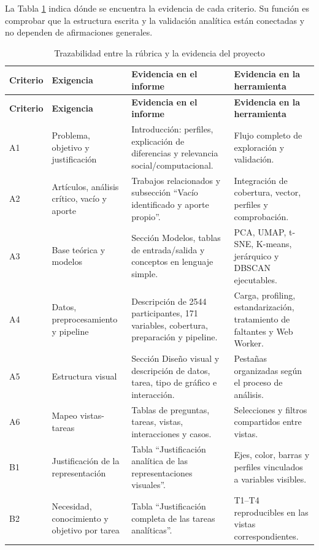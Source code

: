 \documentclass[12pt,a4paper]{article}
\begin{document}
La Tabla \ref{tab:rubrica} indica d\'onde se encuentra la evidencia de cada criterio. Su funci\'on es comprobar que la estructura escrita y la validaci\'on anal\'itica est\'an conectadas y no dependen de afirmaciones generales.

\begin{longtable}{p{1.05cm} p{3.3cm} p{5.1cm} p{4.3cm}}
\caption{Trazabilidad entre la r\'ubrica y la evidencia del proyecto}\label{tab:rubrica}\\
\toprule
\textbf{Criterio} & \textbf{Exigencia} & \textbf{Evidencia en el informe} & \textbf{Evidencia en la herramienta} \\
\midrule
\endfirsthead
\toprule
\textbf{Criterio} & \textbf{Exigencia} & \textbf{Evidencia en el informe} & \textbf{Evidencia en la herramienta} \\
\midrule
\endhead
A1 & Problema, objetivo y justificaci\'on & Introducci\'on: perfiles, explicaci\'on de diferencias y relevancia social/computacional. & Flujo completo de exploraci\'on y validaci\'on. \\
A2 & Art\'iculos, an\'alisis cr\'itico, vac\'io y aporte & Trabajos relacionados y subsecci\'on ``Vac\'io identificado y aporte propio''. & Integraci\'on de cobertura, vector, perfiles y comprobaci\'on. \\
A3 & Base te\'orica y modelos & Secci\'on Modelos, tablas de entrada/salida y conceptos en lenguaje simple. & PCA, UMAP, t-SNE, K-means, jer\'arquico y DBSCAN ejecutables. \\
A4 & Datos, preprocesamiento y pipeline & Descripci\'on de 2544 participantes, 171 variables, cobertura, preparaci\'on y pipeline. & Carga, profiling, estandarizaci\'on, tratamiento de faltantes y Web Worker. \\
A5 & Estructura visual & Secci\'on Dise\~no visual y descripci\'on de datos, tarea, tipo de gr\'afico e interacci\'on. & Pesta\~nas organizadas seg\'un el proceso de an\'alisis. \\
A6 & Mapeo vistas-tareas & Tablas de preguntas, tareas, vistas, interacciones y casos. & Selecciones y filtros compartidos entre vistas. \\
B1 & Justificaci\'on de la representaci\'on & Tabla ``Justificaci\'on anal\'itica de las representaciones visuales''. & Ejes, color, barras y perfiles vinculados a variables visibles. \\
B2 & Necesidad, conocimiento y objetivo por tarea & Tabla ``Justificaci\'on completa de las tareas anal\'iticas''. & T1--T4 reproducibles en las vistas correspondientes. \\

\end{longtable}
\end{document}
